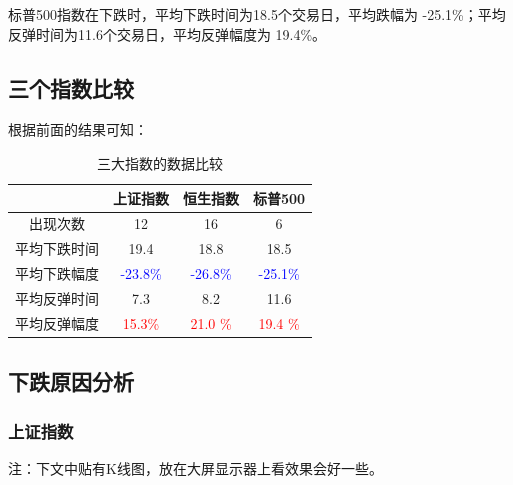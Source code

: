 \documentclass[12pt,a4paper]{article}
\begin{document}
标普500指数在下跌时，平均下跌时间为18.5个交易日，平均跌幅为 -25.1\%；平均反弹时间为11.6个交易日，平均反弹幅度为 19.4\%。

\subsection{三个指数比较}

根据前面的结果可知：


\begin{table}[H]
\centering  %
\begin{tabular}{|c|c|c|c|}  %
\hline
& 上证指数 & 恒生指数 & 标普500 \\ \hline 
出现次数& 12 & 16 & 6 \\ \hline
平均下跌时间 & 19.4 & 18.8 & 18.5 \\ \hline
平均下跌幅度 & \textcolor{blue}{-23.8\%}  & \textcolor{blue}{-26.8\%}  &\textcolor{blue}{-25.1\%}  \\ \hline
平均反弹时间 & 7.3   & 8.2 & 11.6 \\ \hline
平均反弹幅度 & \textcolor{red}{15.3\%}  & \textcolor{red}{21.0 \%}  & \textcolor{red}{19.4 \%}  \\ \hline


\end{tabular}
\caption{三大指数的数据比较}
\end{table}


\subsection{下跌原因分析}

\subsubsection{上证指数}
注：下文中贴有K线图，放在大屏显示器上看效果会好一些。
\end{document}
